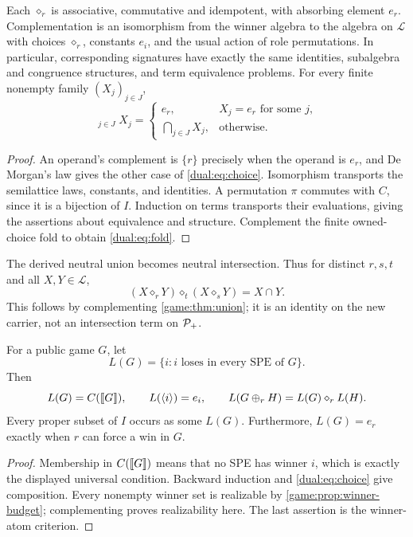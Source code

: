 \begin{proposition}\label{dual:prop:transport}
Each $\diamond_r$ is associative, commutative and idempotent, with
absorbing element $e_r$. Complementation is an isomorphism from the
winner algebra to the algebra on $\mathcal L$ with choices
$\diamond_r$, constants $e_i$, and the usual action of role
permutations. In particular, corresponding signatures have exactly the
same identities, subalgebra and congruence structures, and term
equivalence problems. For every finite nonempty family $(X_j)_{j\in J}$,
\begin{equation}\label{dual:eq:fold}
 \mathop{\diamond_r}_{j\in J}X_j=
 \begin{cases}
 e_r,&X_j=e_r\text{ for some }j,\\
 \bigcap_{j\in J}X_j,&\text{otherwise}.
 \end{cases}
\end{equation}
\end{proposition}
\begin{proof}
An operand's complement is $\{r\}$ precisely when the operand is
$e_r$, and De Morgan's law gives the other case of
\eqref{dual:eq:choice}. Isomorphism transports the semilattice laws,
constants, and identities. A permutation $\pi$ commutes with $C$,
since it is a bijection of $I$. Induction on terms transports their
evaluations, giving the assertions about equivalence and structure.
Complement the finite owned-choice fold to obtain
\eqref{dual:eq:fold}.
\end{proof}

The derived neutral union becomes neutral intersection. Thus for distinct
$r,s,t$ and all $X,Y\in\mathcal L$,
\begin{equation}\label{dual:eq:intersection}
 (X\diamond_r Y)\diamond_t(X\diamond_s Y)=X\cap Y.
\end{equation}
This follows by complementing \cref{game:thm:union}; it is an identity
on the new carrier, not an intersection term on $\mathcal P_+$.

\begin{proposition}\label{dual:prop:semantics}
For a public game $G$, let
\[
 L(G)=\{i:\text{$i$ loses in every SPE of $G$}\}.
\]
Then
\[
 L(G)=C(\llbracket G\rrbracket),\qquad L(\langle i\rangle)=e_i,\qquad
 L(G\mathbin{\oplus_{r}} H)=L(G)\diamond_r L(H).
\]
Every proper subset of $I$ occurs as some $L(G)$. Furthermore,
$L(G)=e_r$ exactly when $r$ can force a win in $G$.
\end{proposition}
\begin{proof}
Membership in $C(\llbracket G\rrbracket)$ means that no SPE has winner $i$, which
is exactly the displayed universal condition. Backward induction and
\eqref{dual:eq:choice} give composition. Every nonempty winner set is
realizable by \cref{game:prop:winner-budget}; complementing proves
realizability here. The last assertion is the winner-atom criterion.
\end{proof}

